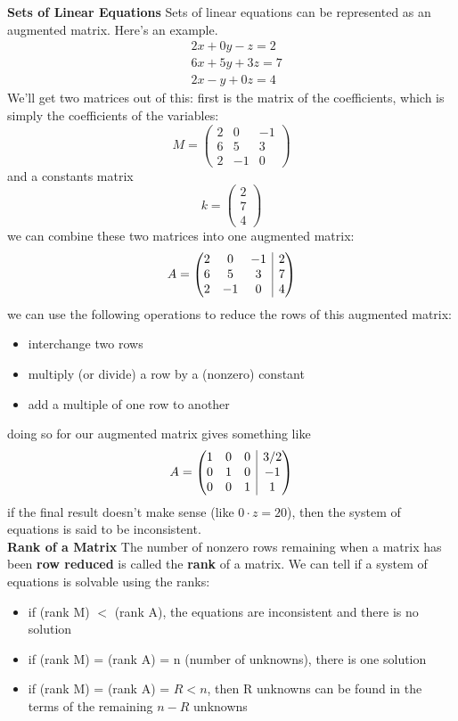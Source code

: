 \documentclass[oneside]{book}
\makeatletter
\numberwithin{equation}{chapter} %
\newenvironment{amatrix}[1]{%
	\left(\begin{array}{@{}*{#1}{c}|c@{}}
	}{%
	\end{array}\right)
}
\makeatother
\begin{document}
\textbf{Sets of Linear Equations}
Sets of linear equations can be represented as an augmented matrix. Here's an example. 
\begin{align*}
	&2x+0y-z=2\\
	&6x+5y+3z=7\\
	&2x-y+0z=4
\end{align*}
We'll get two matrices out of this: first is the matrix of the coefficients, which is simply the coefficients of the variables:
$$
M=
\begin{pmatrix}
	2&0&-1\\6&5&3\\2&-1&0
\end{pmatrix}
$$
and a constants matrix
$$
k=
\begin{pmatrix}
	2\\7\\4
\end{pmatrix}
$$
we can combine these two matrices into one augmented matrix:
$$
A=
\begin{amatrix}{3}
	2&0&-1&2\\6&5&3&7\\2&-1&0&4
\end{amatrix}
$$
we can use the following operations to reduce the rows of this augmented matrix:
\begin{itemize}
	\item interchange two rows
	\item multiply (or divide) a row by a (nonzero) constant
	\item add a multiple of one row to another
\end{itemize}
doing so for our augmented matrix gives something like 
$$
A=
\begin{amatrix}{3}
	1&0&0&3/2\\0&1&0&-1\\0&0&1&1
\end{amatrix}
$$
if the final result doesn't make sense (like $0\cdot z=20$), then the system of equations is said to be inconsistent.\\

\textbf{Rank of a Matrix} The number of nonzero rows remaining when a matrix has been \textbf{row reduced} is called the \textbf{rank} of a matrix. We can tell if a system of equations is solvable using the ranks:
\begin{itemize}
	\item if (rank M) $<$ (rank A), the equations are inconsistent and there is no solution
	\item if (rank M) = (rank A) = n (number of unknowns), there is one solution
	\item if (rank M) = (rank A) = $R < n$, then R unknowns can be found in the terms of the remaining $n-R$ unknowns 
\end{itemize}
\end{document}
